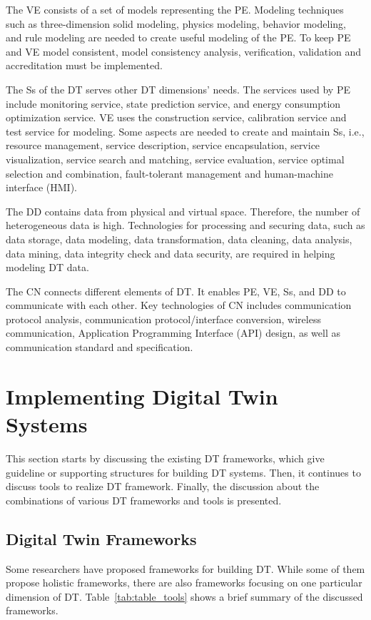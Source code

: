 \documentclass[article,table]{aaltoseries}
\begin{document}
The VE consists of a set of models representing the PE. Modeling techniques such as three-dimension solid modeling, physics modeling, behavior modeling, and rule modeling are needed to create useful modeling of the PE. To keep PE and VE model consistent, model consistency analysis, verification, validation and accreditation must be implemented.

The Ss of the DT serves other DT dimensions' needs. The services used by PE include monitoring service, state prediction service, and energy consumption optimization service. VE uses the construction service, calibration service and test service for modeling. Some aspects are needed to create and maintain Ss, i.e., resource management, service description, service encapsulation, service visualization, service search and matching, service evaluation, service optimal selection and combination, fault-tolerant management and human-machine interface (HMI).

The DD contains data from physical and virtual space. Therefore, the number of heterogeneous data is high. Technologies for processing and securing data, such as data storage, data modeling, data transformation, data cleaning, data analysis, data mining, data integrity check and data security, are required in helping modeling DT data.

The CN connects different elements of DT. It enables PE, VE, Ss, and DD to communicate with each other. Key technologies of CN includes communication protocol analysis, communication protocol/interface conversion, wireless communication, Application Programming Interface (API) design, as well as communication standard and specification.

\section{Implementing Digital Twin Systems}
This section starts by discussing the existing DT frameworks, which give guideline or supporting structures for building DT systems. Then, it continues to discuss tools to realize DT framework. Finally, the discussion about the combinations of various DT frameworks and tools is presented.

\subsection{Digital Twin Frameworks}
Some researchers have proposed frameworks for building DT. While some of them propose holistic frameworks, there are also frameworks focusing on one particular dimension of DT. Table~\ref{tab:table_tools} shows a brief summary of the discussed frameworks.
\end{document}
